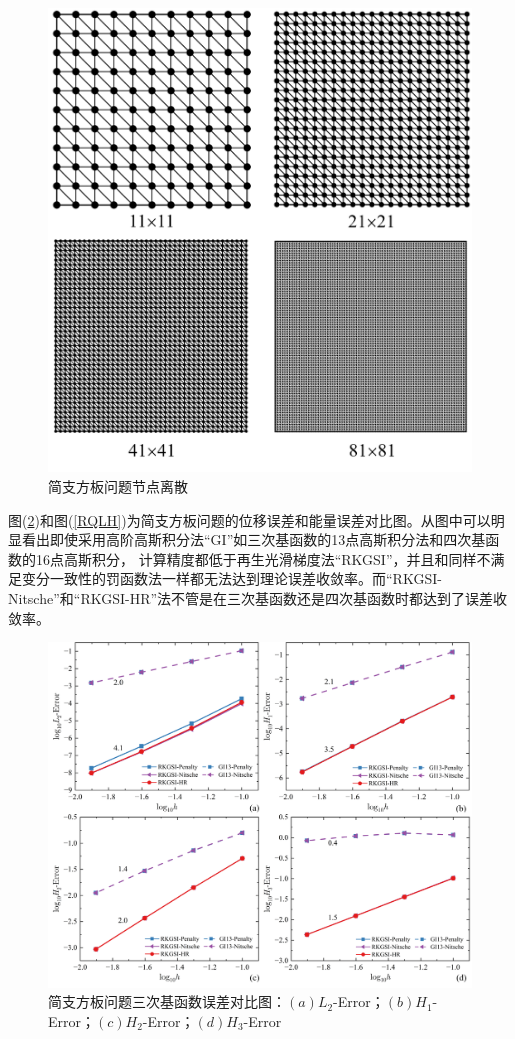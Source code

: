 \begin{figure}[!h]
\centering
  \includegraphics[scale=0.35]{figure/P/R/rectangular.msh.png}
\caption{简支方板问题节点离散}\label{rectangularmsh}
\end{figure}\newpage
图(\ref{RCLH})和图(\ref{RQLH})为简支方板问题的位移误差和能量误差对比图。从图中可以明显看出即使采用高阶高斯积分法“GI”如三次基函数的13点高斯积分法和四次基函数的16点高斯积分，
计算精度都低于再生光滑梯度法“RKGSI”，并且和同样不满足变分一致性的罚函数法一样都无法达到理论误差收敛率。而“RKGSI-Nitsche”和“RKGSI-HR”法不管是在三次基函数还是四次基函数时都达到了误差收敛率。\par
\begin{figure}[!h]
\centering
\includegraphics[scale=0.6]{figure/P/R/CLH.png}
\caption{简支方板问题三次基函数误差对比图：$(a)L_2$-Error；$(b)H_1$-Error；$(c)H_2$-Error；$(d)H_3$-Error}\label{RCLH}
\end{figure}
